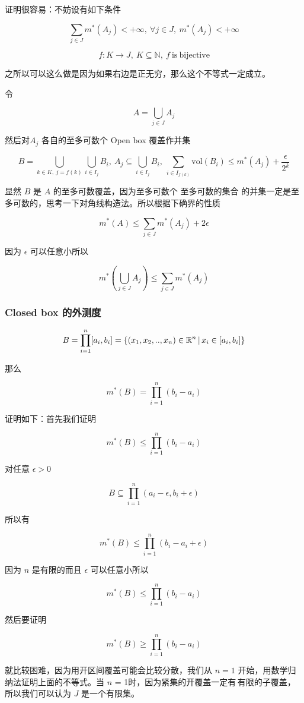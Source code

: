 证明很容易：不妨设有如下条件

\[
\sum_{j \in J}m^*(A_j) < +\infty ,\: \forall j \in J,\: m^*(A_j) < +\infty
\]

\[
f: K \to J,\: K \subseteq \mathbb{N} ,\: f\mathrm{\: is \: bijective}
\]

之所以可以这么做是因为如果右边是正无穷，那么这个不等式一定成立。

令

\[
A = \bigcup_{j \in J}A_j
\]

然后对$A_j$ 各自的至多可数个 Open box 覆盖作并集

\[
B = \bigcup_{k \in K ,\: j = f(k)}\bigcup_{i \in I_j} B_i, \: A_{j} \subseteq \bigcup_{i \in I_j} B_i, \: \sum_{i \in I_{f(k)}} \mathrm{vol}(B_i) \le m^*(A_j) + \frac{\epsilon}{2^k}
\]

显然 $B$ 是 $A$ 的至多可数覆盖，因为至多可数个 \: 至多可数的集合 \: 的并集一定是至多可数的，思考一下对角线构造法。所以根据下确界的性质

\[
m^*(A) \le \sum_{j \in J}m^*(A_j) + 2\epsilon
\]

因为 $\epsilon$ 可以任意小所以

\[
m^*(\bigcup_{j \in J}A_j) \le \sum_{j \in J}m^*(A_j)
\]

\subsubsection{Closed box 的外测度}

\[
B = \prod_{i=1}^{n}[a_i, b_i] = \{ (x_1, x_2, .., x_n) \in \mathbb{R}^n \,\vert\, x_i \in [a_i, b_i] \}
\]

那么

\[
m^*(B) = \prod_{i=1}^{n}(b_i - a_i)
\]

证明如下：首先我们证明

\[
m^*(B) \le \prod_{i=1}^{n}(b_i - a_i)
\]

对任意 $\epsilon > 0$ 

\[
B \subseteq \prod_{i=1}^{n}(a_i - \epsilon, b_i + \epsilon)
\]

所以有

\[
m^*(B) \le \prod_{i=1}^{n}(b_i - a_i + \epsilon)
\]

因为 $n$ 是有限的而且 $\epsilon$ 可以任意小所以


\[
m^*(B) \le \prod_{i=1}^{n}(b_i - a_i)
\]

然后要证明


\[
m^*(B) \ge \prod_{i=1}^{n}(b_i - a_i)
\]

就比较困难，因为用开区间覆盖可能会比较分散，我们从 $n = 1$ 开始，用数学归纳法证明上面的不等式。当 $n$ = 1时，因为紧集的开覆盖一定有\,有限的子覆盖，所以我们可以认为 $J$ 是一个有限集。

